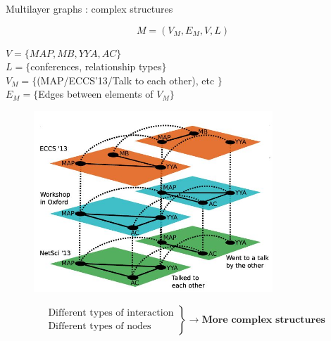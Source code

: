 \documentclass[15pt]{beamer}
\begin{document}
\begin{frame}{Multilayer graphs : complex structures}

\[
	M=(V_M,E_M,V,L)
\]
\begin{minipage}{0.4\textwidth}
\begin{footnotesize}
$V = \{MAP,MB,YYA,AC\}$\\
$L = \{$conferences, relationship types$\}$\\
$V_M = \{$(MAP/ECCS'13/Talk to each other), etc $\}$\\
$E_M = \{$Edges between elements of $V_M \}$
\end{footnotesize}
\end{minipage}
\begin{minipage}[r]{0.59\textwidth}
\begin{figure}
    \flushright
    \includegraphics[width=0.8\textwidth]{img/exMulti.jpg}
    \label{fig:exmultitransport}
\end{figure}
\end{minipage}
$$
\left.
\begin{array}{l}
    \text{ Different types of interaction}\\
    \text{ Different types of nodes}
\end{array}
\right \}\rightarrow \textbf{More complex structures}
$$

\end{frame}
\end{document}
